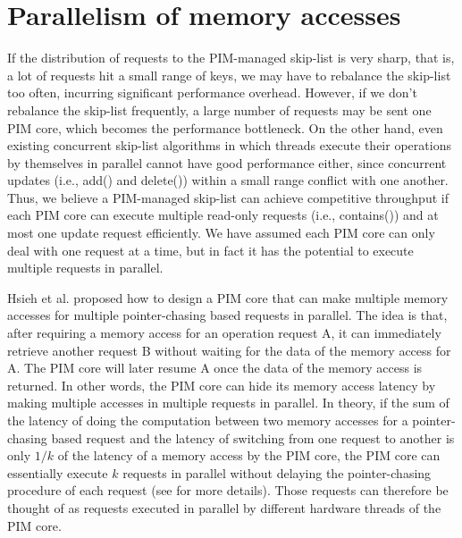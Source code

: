 \documentclass[11pt]{article}
\begin{document}
\section{Parallelism of memory accesses}
If the distribution of requests to the PIM-managed skip-list is very sharp, that is, 
a lot of requests hit a small range of keys, we may have to rebalance the skip-list too often, 
incurring significant performance overhead. 
However, if we don't rebalance the skip-list frequently, 
a large number of requests may be sent one PIM core, which becomes the performance bottleneck. 
On the other hand, even existing concurrent skip-list algorithms in which threads execute 
their operations by themselves in parallel cannot have good performance either, 
since concurrent updates (i.e., add() and delete()) within a small range conflict with one another. 
Thus, we believe a PIM-managed skip-list can achieve competitive throughput if each PIM core can 
execute multiple read-only requests (i.e., contains()) and at most one update request efficiently. 
We have assumed each PIM core can only deal with one request at a time, 
but in fact it has the potential to execute multiple requests in parallel.

Hsieh et al. \cite{hsieh2016accelerating} proposed how to design a PIM core that 
can make multiple memory accesses for multiple pointer-chasing based requests in parallel. 
The idea is that, after requiring a memory access for an operation request A, 
it can immediately retrieve another request B without waiting for the data of the memory access for A. 
The PIM core will later resume A once the data of the memory access is returned.  
In other words, the PIM core can hide its memory access latency by making multiple accesses 
in multiple requests in parallel. 
In theory, if the sum of the latency of doing the computation between two memory accesses 
for a pointer-chasing based request and the latency of switching from one request to another 
is only $1/k$ of the latency of a memory access by the PIM core, 
the PIM core can essentially execute $k$ requests in parallel without delaying the pointer-chasing 
procedure of each request (see \cite{hsieh2016accelerating} for more details). 
Those requests can therefore be thought of as requests executed in parallel
by different hardware threads of the PIM core. 
\end{document}
